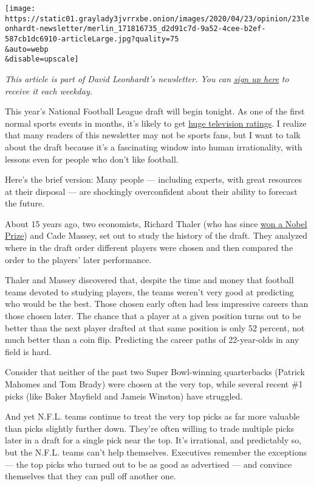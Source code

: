 \texttt{[image: https://static01.graylady3jvrrxbe.onion/images/2020/04/23/opinion/23leonhardt-newsletter/merlin\_171816735\_d2d91c7d-9a52-4cee-b2ef-587cb1dc6910-articleLarge.jpg?quality=75\\\&auto=webp\\\&disable=upscale]}

\emph{This article is part of David Leonhardt's newsletter. You can}
\href{https://www.nytimes3xbfgragh.onion/newsletters/opiniontoday?action=click\&module=Intentional\&pgtype=Article}{\emph{sign
up here}} \emph{to receive it each weekday.}

This year's National Football League draft will begin tonight. As one of
the first normal sports events in months, it's likely to get
\href{https://www.nytimes3xbfgragh.onion/2020/04/20/sports/football/nfl-draft-virtual-past.html}{huge
television ratings}. I realize that many readers of this newsletter may
not be sports fans, but I want to talk about the draft because it's a
fascinating window into human irrationality, with lessons even for
people who don't like football.

Here's the brief version: Many people --- including experts, with great
resources at their disposal --- are shockingly overconfident about their
ability to forecast the future.

About 15 years ago, two economists, Richard Thaler (who has since
\href{https://www.nobelprize.org/prizes/economic-sciences/2017/thaler/facts/}{won
a Nobel Prize}) and Cade Massey, set out to study the history of the
draft. They analyzed where in the draft order different players were
chosen and then compared the order to the players' later performance.

Thaler and Massey discovered that, despite the time and money that
football teams devoted to studying players, the teams weren't very good
at predicting who would be the best. Those chosen early often had less
impressive careers than those chosen later. The chance that a player at
a given position turns out to be better than the next player drafted at
that same position is only 52 percent, not much better than a coin flip.
Predicting the career paths of 22-year-olds in any field is hard.

Consider that neither of the past two Super Bowl-winning quarterbacks
(Patrick Mahomes and Tom Brady) were chosen at the very top, while
several recent \#1 picks (like Baker Mayfield and Jameis Winston) have
struggled.

And yet N.F.L. teams continue to treat the very top picks as far more
valuable than picks slightly further down. They're often willing to
trade multiple picks later in a draft for a single pick near the top.
It's irrational, and predictably so, but the N.F.L. teams can't help
themselves. Executives remember the exceptions --- the top picks who
turned out to be as good as advertised --- and convince themselves that
they can pull off another one.

